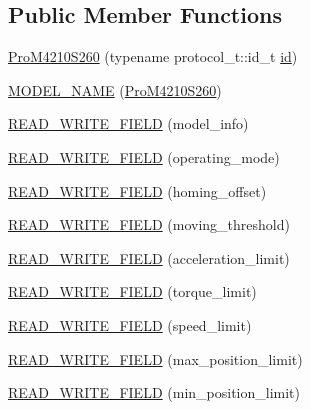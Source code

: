 \subsection*{Public Member Functions}
\begin{DoxyCompactItemize}
\item 
\hyperlink{classdynamixel_1_1servos_1_1_pro_m4210_s260_ad29a29cf2de07386cf811a5972fd958f}{Pro\+M4210\+S260} (typename protocol\+\_\+t\+::id\+\_\+t \hyperlink{classdynamixel_1_1servos_1_1_servo_a2d022081672e25a7bb57b76706e1cc57}{id})
\item 
\hyperlink{classdynamixel_1_1servos_1_1_pro_m4210_s260_a0a58e4e3fbaf225e446eb4bcc3364c9a}{M\+O\+D\+E\+L\+\_\+\+N\+A\+M\+E} (\hyperlink{classdynamixel_1_1servos_1_1_pro_m4210_s260}{Pro\+M4210\+S260})
\item 
\hyperlink{classdynamixel_1_1servos_1_1_pro_m4210_s260_a17b72c0cf7e912b3ccdac1001d7e1b36}{R\+E\+A\+D\+\_\+\+W\+R\+I\+T\+E\+\_\+\+F\+I\+E\+L\+D} (model\+\_\+info)
\item 
\hyperlink{classdynamixel_1_1servos_1_1_pro_m4210_s260_a6fbc443a66d743af0e99cfaf2357f3c3}{R\+E\+A\+D\+\_\+\+W\+R\+I\+T\+E\+\_\+\+F\+I\+E\+L\+D} (operating\+\_\+mode)
\item 
\hyperlink{classdynamixel_1_1servos_1_1_pro_m4210_s260_a82c93b24800b34201b67241bf5691052}{R\+E\+A\+D\+\_\+\+W\+R\+I\+T\+E\+\_\+\+F\+I\+E\+L\+D} (homing\+\_\+offset)
\item 
\hyperlink{classdynamixel_1_1servos_1_1_pro_m4210_s260_afc979fc03811025e03e2f60efac185bc}{R\+E\+A\+D\+\_\+\+W\+R\+I\+T\+E\+\_\+\+F\+I\+E\+L\+D} (moving\+\_\+threshold)
\item 
\hyperlink{classdynamixel_1_1servos_1_1_pro_m4210_s260_a59848db7fa95092352678a9675b553d6}{R\+E\+A\+D\+\_\+\+W\+R\+I\+T\+E\+\_\+\+F\+I\+E\+L\+D} (acceleration\+\_\+limit)
\item 
\hyperlink{classdynamixel_1_1servos_1_1_pro_m4210_s260_ad56db1d0eff11fbc8907f9dd0a491edc}{R\+E\+A\+D\+\_\+\+W\+R\+I\+T\+E\+\_\+\+F\+I\+E\+L\+D} (torque\+\_\+limit)
\item 
\hyperlink{classdynamixel_1_1servos_1_1_pro_m4210_s260_a932d62be86ed5320e86f6b7890cf5f05}{R\+E\+A\+D\+\_\+\+W\+R\+I\+T\+E\+\_\+\+F\+I\+E\+L\+D} (speed\+\_\+limit)
\item 
\hyperlink{classdynamixel_1_1servos_1_1_pro_m4210_s260_a2b7f16479b9d1547bb95253b0420fa47}{R\+E\+A\+D\+\_\+\+W\+R\+I\+T\+E\+\_\+\+F\+I\+E\+L\+D} (max\+\_\+position\+\_\+limit)
\item 
\hyperlink{classdynamixel_1_1servos_1_1_pro_m4210_s260_a173eb9606c514651c77d2362222566d3}{R\+E\+A\+D\+\_\+\+W\+R\+I\+T\+E\+\_\+\+F\+I\+E\+L\+D} (min\+\_\+position\+\_\+limit)

\end{DoxyCompactItemize}
